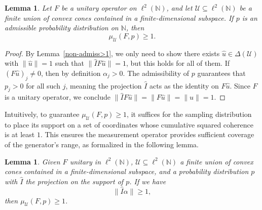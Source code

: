\documentclass[a4paper,oneside]{amsart}
\newtheorem{lemma}[theorem]{Lemma}
\newcommand{\lnn}{\ell^2(\mathbb{N})}
\begin{document}
\begin{lemma}\label{admiss>1}
   Let $F$ be a unitary operator on $\lnn$, and let $\mathcal{U} \subseteq \lnn$ be a finite union of convex cones contained in a finite-dimensional subspace. If $p$ is an admissible probability distribution on $\mathbb{N}$, then$$\mu_{\mathcal{U}}(F,p) \geq 1.$$
\end{lemma}
\begin{proof}
    By Lemma~\ref{non-admiss>1}, we only need to show there exists $\hat{u} \in \Delta(\mathcal{U})$ with $\| \hat{u} \|=1$ such that $\| \hat{I}F\hat{u} \| = 1$, but this holds for all of them. If $(F\hat{u})_j \neq 0$, then by definition $\alpha_j > 0$. The admissibility of $p$ guarantees that $p_j > 0$ for all such $j$, meaning the projection $\hat{I}$ acts as the identity on $F\hat{u}$. Since $F$ is a unitary operator, we conclude $\|\hat{I}F\hat{u}\| = \|F\hat{u}\| = \|\hat{u}\| = 1$. 
\end{proof}

Intuitively, to guarantee $\mu_{\mathcal{U}}(F,p) \geq 1$, it suffices for the sampling distribution to place its support on a set of coordinates whose cumulative squared coherence is at least $1$. This ensures the measurement operator provides sufficient coverage of the generator's range, as formalized in the following lemma.

\begin{lemma}\label{coherence-energy-bound}
    Given $F$ unitary in $\lnn$, $\mathcal{U}\subseteq\lnn$ a finite union of convex cones contained in a finite-dimensional subspace, and a probability distribution $p$ with $\hat{I}$ the projection on the support of $p$. If we have 
    \begin{equation}\label{magg-1}
        \| \hat{I} \alpha \| \geq 1,
    \end{equation}
    then $\mu_{\mathcal{U}}(F,p) \geq 1$.
\end{lemma}
\end{document}
